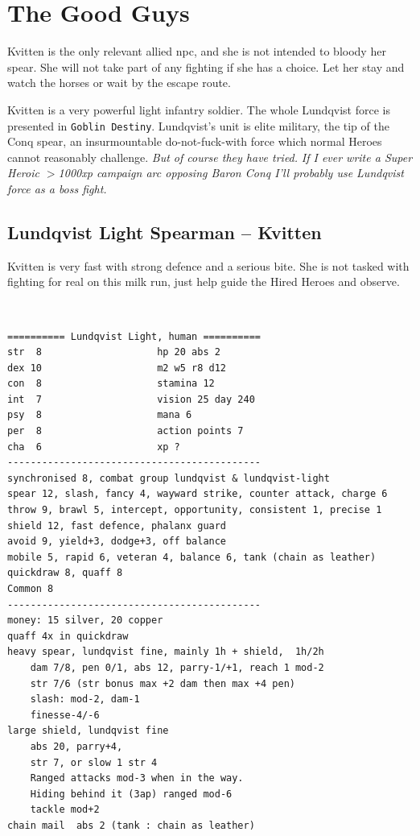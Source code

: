 \section*{The Good Guys}
Kvitten is the only relevant allied npc, and she is not intended to bloody her spear. She will not take part of any fighting if she has a choice. Let her stay and watch the horses or wait by the escape route.

Kvitten is a very powerful light infantry soldier. The whole Lundqvist force is presented in \texttt{Goblin Destiny}. Lundqvist's unit is elite military, the tip of the Conq spear, an insurmountable do-not-fuck-with force which normal Heroes cannot reasonably challenge. \textit{But of course they have tried.}
\textit{If I ever write a Super Heroic $>$1000xp campaign arc opposing Baron Conq I'll probably use Lundqvist force as a boss fight.}




\begin{samepage}
\subsection*{Lundqvist Light Spearman -- Kvitten}
Kvitten is very fast with strong defence and a serious bite. She is not tasked with fighting for real on this milk run, just help guide the Hired Heroes and observe.

\

\small \begin{verbatim}
========== Lundqvist Light, human ==========
str  8                    hp 20 abs 2
dex 10                    m2 w5 r8 d12
con  8                    stamina 12
int  7                    vision 25 day 240
psy  8                    mana 6
per  8                    action points 7
cha  6                    xp ?
--------------------------------------------
synchronised 8, combat group lundqvist & lundqvist-light
spear 12, slash, fancy 4, wayward strike, counter attack, charge 6
throw 9, brawl 5, intercept, opportunity, consistent 1, precise 1
shield 12, fast defence, phalanx guard
avoid 9, yield+3, dodge+3, off balance
mobile 5, rapid 6, veteran 4, balance 6, tank (chain as leather)
quickdraw 8, quaff 8
Common 8
--------------------------------------------
money: 15 silver, 20 copper
quaff 4x in quickdraw
heavy spear, lundqvist fine, mainly 1h + shield,  1h/2h
    dam 7/8, pen 0/1, abs 12, parry-1/+1, reach 1 mod-2
    str 7/6 (str bonus max +2 dam then max +4 pen)
    slash: mod-2, dam-1
    finesse-4/-6
large shield, lundqvist fine
    abs 20, parry+4,
    str 7, or slow 1 str 4
    Ranged attacks mod-3 when in the way.
    Hiding behind it (3ap) ranged mod-6
    tackle mod+2
chain mail  abs 2 (tank : chain as leather)
\end{verbatim} \normalsize
\end{samepage}

